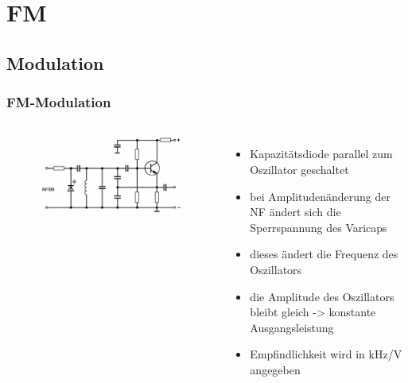 \section{FM}

\subsection{Modulation}

\begin{frame}
  \frametitle{FM-Modulation}

  \begin{columns}
    \begin{figure}
      \includegraphics[width=\textwidth,height=.85\textheight,keepaspectratio]{a12/td514.png}
    \end{figure}
    \begin{itemize}
      \item Kapazitätsdiode parallel zum Oszillator geschaltet
      \item bei Amplitudenänderung der NF ändert sich die Sperrspannung des Varicaps
      \item dieses ändert die Frequenz des Oszillators
      \item die Amplitude des Oszillators bleibt gleich -> konstante Ausgangsleistung
      \item Empfindlichkeit wird in kHz/V angegeben
    \end{itemize}
  \end{columns}
\end{frame}


